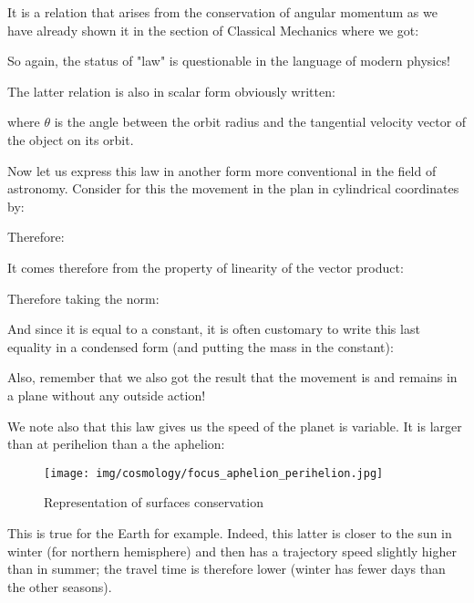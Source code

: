 	
	It is a relation that arises from the conservation of angular momentum as we have already shown it in the section of Classical Mechanics where we got:
	
	
	So again, the status of "law" is questionable in the language of modern physics!
	
	The latter relation is also in scalar form obviously written:
	
	where $\theta$ is the angle between the orbit radius and the tangential velocity vector of the object on its orbit.
	
	Now let us express this law in another form more conventional in the field of astronomy. Consider for this the movement in the plan in cylindrical coordinates by:
	
	Therefore:
	
	
	It comes therefore from the property of linearity of the vector product:
	
	Therefore taking the norm:
	
	And since it is equal to a constant, it is often customary to write this last equality in a condensed form (and putting the mass in the constant):
	
	Also, remember that we also got the result that the movement is and remains in a plane without any outside action!
	
	We note also that this law gives us the speed of the planet is variable. It is larger than at perihelion than a the aphelion:
	\begin{figure}[H]
		\begin{center}
		\texttt{[image: img/cosmology/focus\_aphelion\_perihelion.jpg]}
		\end{center}	
		\caption{Representation of surfaces conservation}
	\end{figure}
	This is true for the Earth for example. Indeed, this latter is closer to the sun in winter (for northern hemisphere) and then has a trajectory speed slightly higher than in summer; the travel time is therefore lower (winter has fewer days than the other seasons).
	
